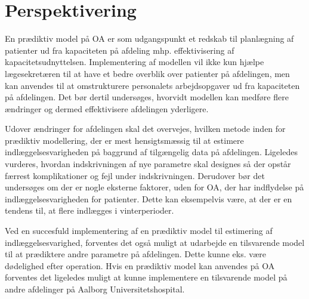\section{Perspektivering} 
En prædiktiv model på OA er som udgangspunkt et redskab til planlægning af patienter ud fra kapaciteten på afdeling mhp. effektivisering af kapacitetsudnyttelsen. Implementering af modellen vil ikke kun hjælpe lægesekretæren til at have et bedre overblik over patienter på afdelingen, men kan anvendes til at omstrukturere personalets arbejdsopgaver ud fra kapaciteten på afdelingen. Det bør dertil undersøges, hvorvidt modellen kan medføre flere ændringer og dermed effektivisere afdelingen yderligere. 


Udover ændringer for afdelingen skal det overvejes, hvilken metode inden for prædiktiv modellering, der er mest hensigtsmæssig til at estimere indlæggelsesvarigheden på baggrund af tilgængelig data på afdelingen. Ligeledes vurderes, hvordan indskrivningen af nye parametre skal designes så der opstår færrest komplikationer og fejl under indskrivningen. 
Derudover bør det undersøges om der er nogle eksterne faktorer, uden for OA, der har indflydelse på indlæggelsesvarigheden for patienter. Dette kan eksempelvis være, at der er en tendens til, at flere indlægges i vinterperioder.

Ved en succesfuld implementering af en prædiktiv model til estimering af indlæggelsesvarighed, forventes det også muligt at udarbejde en tilsvarende model til at prædiktere andre parametre på afdelingen. Dette kunne eks. være dødelighed efter operation.
Hvis en prædiktiv model kan anvendes på OA forventes det ligeledes muligt at kunne implementere en tilsvarende model på andre afdelinger på Aalborg Universitetshospital.